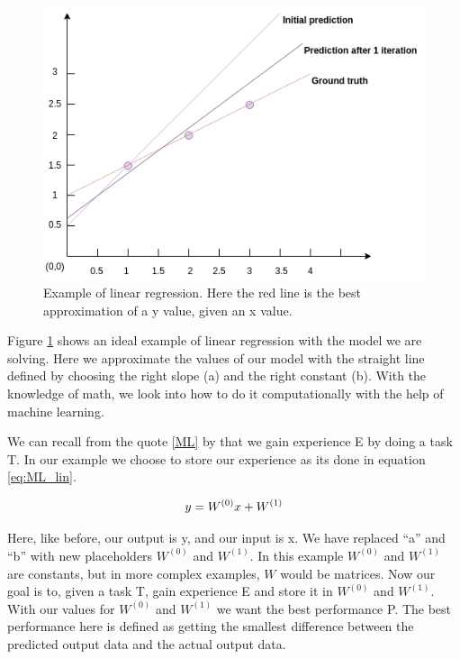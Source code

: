 \begin{figure}
\centering
\includegraphics[scale=0.7]{background/figures/regression.png}
\caption{Example of linear regression. Here the red line is the best approximation of a y value, given an x value.} 
\label{fig:regression_example}
\end{figure} 
Figure \ref{fig:regression_example} shows an ideal example of linear regression with the model we are solving. Here we approximate the values of our model with the straight line defined by choosing the right slope (a) and the right constant (b).
With the knowledge of math, we look into how to do it computationally with the help of machine learning. 


We can recall from the quote \ref{ML} by \cite{MitchellTomM1997Ml} that we gain experience E by doing a task T. In our example we choose to store our experience as its done in equation \ref{eq:ML_lin}.
    
\begin{equation}
y=W^{(0)}x+W^{(1)}\\
\label{eq:ML_lin}
\end{equation}

\noindent Here, like before, our output is y, and our input is x. We have replaced ``a'' and ``b'' with new placeholders $W^{(0)}$ and $W^{(1)}$. In this example  $W^{(0)}$ and $W^{(1)}$ are constants, but in more complex examples, $W$ would be matrices.
Now our goal is to, given a task T, gain experience E and store it in $W^{(0)}$ and $W^{(1)}$. With our values for $W^{(0)}$ and $W^{(1)}$ we want the best performance P.  The best performance here is defined as getting the smallest difference between the predicted output data and the actual output data. 

